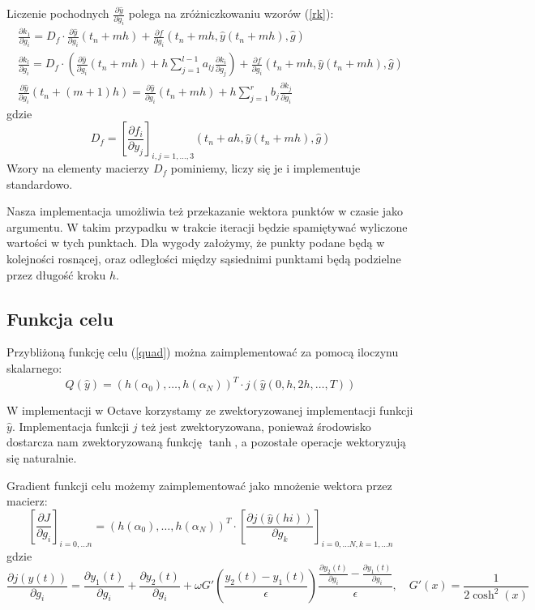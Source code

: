 \documentclass[11pt]{article}
\begin{document}
Liczenie pochodnych $\frac{\partial \hat{y}}{\partial g_i}$ polega na zróżniczkowaniu wzorów (\ref{rk}):
\begin{gather}
    \frac{\partial k_1}{\partial g_i} = D_f \cdot \frac{\partial \hat{y}}{\partial g_i}(t_n + mh) + \frac{\partial f}{\partial g_i}(t_n + mh, \hat{y}(t_n + mh), \hat{g}) \nonumber \\
    \frac{\partial k_l}{\partial g_i}  = D_f \cdot \left(\frac{\partial \hat{y}}{\partial g_i}(t_n + mh) + h\sum_{j=1}^{l-1} a_{lj}\frac{\partial k_i}{\partial g_j} \right) + \frac{\partial f}{\partial g_i}(t_n + mh, \hat{y}(t_n + mh), \hat{g})  \label{drk}\\
    \frac{\partial \hat{y}}{\partial g_i}(t_n + (m+1)h) = \frac{\partial \hat{y}}{\partial g_i}(t_n + mh) + h\sum_{j=1}^r b_j \frac{\partial k_j}{\partial g_i} \nonumber
\end{gather}
gdzie
\begin{equation} \label{Df}
  D_f = {\left[\frac{\partial f_i}{\partial y_j}\right]}_{i,j = 1,\ldots, 3} (t_n + ah, \hat{y}(t_n + mh), \hat{g})
\end{equation}
Wzory na elementy macierzy $D_f$ pominiemy, liczy się je i implementuje standardowo.

Nasza implementacja umożliwia też przekazanie wektora punktów w czasie jako argumentu. W takim przypadku w trakcie iteracji będzie spamiętywać wyliczone wartości w tych punktach. Dla wygody założymy, że punkty podane będą w kolejności rosnącej, oraz odległości między sąsiednimi punktami będą podzielne przez długość kroku $h$.

\subsection{Funkcja celu}
Przybliżoną funkcję celu (\ref{quad}) można zaimplementować za pomocą iloczynu skalarnego:
\begin{equation}
  Q(\hat{y}) = {\left(h(\alpha_0),\ldots,h(\alpha_N)\right)}^T \cdot {j(\hat{y}(0, h, 2h, \ldots, T))}
\end{equation}

W implementacji w Octave korzystamy ze zwektoryzowanej implementacji funkcji $\hat{y}$. Implementacja funkcji $j$ też jest zwektoryzowana, ponieważ środowisko dostarcza nam zwektoryzowaną funkcję $\tanh$, a pozostałe operacje wektoryzują się naturalnie.

Gradient funkcji celu możemy zaimplementować jako mnożenie wektora przez macierz:
\begin{equation}
  {\left[\frac{\partial J}{\partial g_i}\right]}_{i = 0, \ldots n} = {\left(h(\alpha_0),\ldots,h(\alpha_N)\right)}^T \cdot {\left[\frac{\partial j(\hat{y}(hi))}{\partial g_k}\right]}_{i = 0, \ldots N, k = 1, \ldots n}
\end{equation}
gdzie
\begin{equation}
  \frac{\partial j(y(t))}{\partial g_i} = \frac{\partial y_1(t)}{\partial g_i} + \frac{\partial y_2(t)}{\partial g_i} + \omega G'\left(\frac{y_2(t) - y_1(t)}{\epsilon}\right)\frac{\frac{\partial y_2(t)}{\partial g_i} - \frac{\partial y_1(t)}{\partial g_i}}{\epsilon},\quad G'(x) = \frac{1}{2\cosh^2(x)}
\end{equation}
\end{document}
